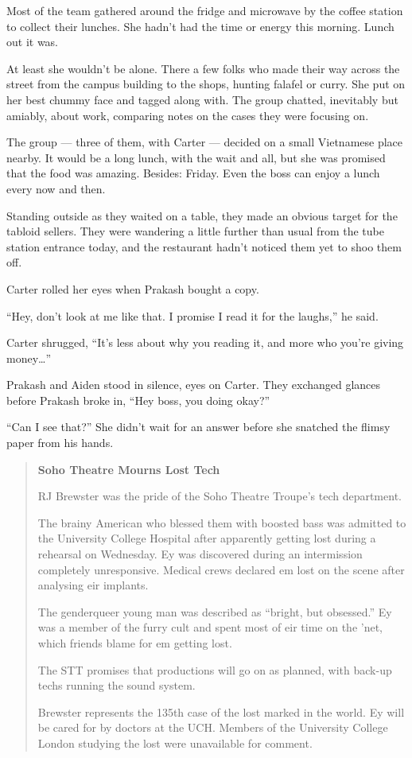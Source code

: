 Most of the team gathered around the fridge and microwave by the coffee station to collect their lunches. She hadn't had the time or energy this morning. Lunch out it was.

At least she wouldn't be alone. There a few folks who made their way across the street from the campus building to the shops, hunting falafel or curry. She put on her best chummy face and tagged along with. The group chatted, inevitably but amiably, about work, comparing notes on the cases they were focusing on.

The group — three of them, with Carter — decided on a small Vietnamese place nearby. It would be a long lunch, with the wait and all, but she was promised that the food was amazing. Besides: Friday. Even the boss can enjoy a lunch every now and then.

Standing outside as they waited on a table, they made an obvious target for the tabloid sellers. They were wandering a little further than usual from the tube station entrance today, and the restaurant hadn't noticed them yet to shoo them off.

Carter rolled her eyes when Prakash bought a copy.

``Hey, don't look at me like that. I promise I read it for the laughs,'' he said.

Carter shrugged, ``It's less about why you reading it, and more who you're giving money\ldots{}''

Prakash and Aiden stood in silence, eyes on Carter. They exchanged glances before Prakash broke in, ``Hey boss, you doing okay?''

``Can I see that?'' She didn't wait for an answer before she snatched the flimsy paper from his hands.

\begin{quote}
\textbf{Soho Theatre Mourns Lost Tech}

RJ Brewster was the pride of the Soho Theatre Troupe's tech department.

The brainy American who blessed them with boosted bass was admitted to the University College Hospital after apparently getting lost during a rehearsal on Wednesday. Ey was discovered during an intermission completely unresponsive. Medical crews declared em lost on the scene after analysing eir implants.

The genderqueer young man was described as ``bright, but obsessed.'' Ey was a member of the furry cult and spent most of eir time on the 'net, which friends blame for em getting lost.

The STT promises that productions will go on as planned, with back-up techs running the sound system.

Brewster represents the 135th case of the lost marked in the world. Ey will be cared for by doctors at the UCH. Members of the University College London studying the lost were unavailable for comment.
\end{quote}

